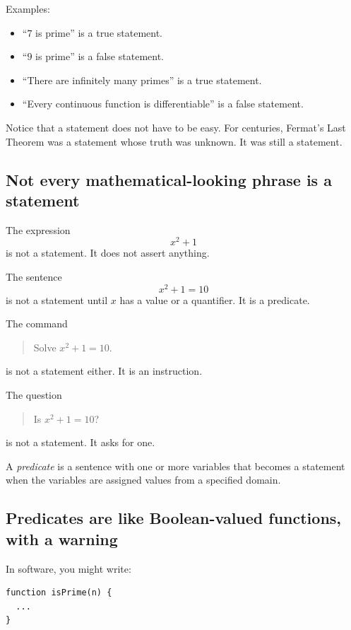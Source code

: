 \documentclass[12pt]{article}
\begin{document}
Examples:

\begin{itemize}
\item ``$7$ is prime'' is a true statement.
\item ``$9$ is prime'' is a false statement.
\item ``There are infinitely many primes'' is a true statement.
\item ``Every continuous function is differentiable'' is a false statement.
\end{itemize}

Notice that a statement does not have to be easy. For centuries, Fermat's Last Theorem was a statement whose truth was unknown. It was still a statement.

\subsection{Not every mathematical-looking phrase is a statement}

The expression
\[
x^2+1
\]
is not a statement. It does not assert anything.

The sentence
\[
x^2+1=10
\]
is not a statement until $x$ has a value or a quantifier. It is a predicate.

The command

\begin{quote}
Solve $x^2+1=10$.
\end{quote}

is not a statement either. It is an instruction.

The question

\begin{quote}
Is $x^2+1=10$?
\end{quote}

is not a statement. It asks for one.

\begin{definition}
A \emph{predicate} is a sentence with one or more variables that becomes a statement when the variables are assigned values from a specified domain.
\end{definition}

\subsection{Predicates are like Boolean-valued functions, with a warning}

In software, you might write:

\begin{verbatim}
function isPrime(n) {
  ...
}
\end{verbatim}
\end{document}
